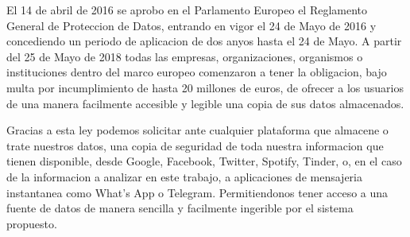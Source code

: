 El 14 de abril de 2016 se aprobo en el Parlamento Europeo el Reglamento General de Proteccion de Datos, entrando en vigor el 24 de Mayo de 2016 y concediendo un periodo de aplicacion de dos anyos hasta el 24 de Mayo. A partir del 25 de Mayo de 2018 todas las empresas, organizaciones, organismos o instituciones dentro del marco europeo comenzaron a tener la obligacion, bajo multa por incumplimiento de hasta 20 millones de euros, de ofrecer a los usuarios de una manera facilmente accesible y legible una copia de sus datos almacenados.

Gracias a esta ley podemos solicitar ante cualquier plataforma que almacene o trate nuestros datos, una copia de seguridad de toda nuestra informacion que tienen disponible, desde Google, Facebook, Twitter, Spotify, Tinder, o, en el caso de la informacion a analizar en este trabajo, a aplicaciones de mensajeria instantanea como What's App o Telegram. Permitiendonos tener acceso a una fuente de datos de manera sencilla y facilmente ingerible por el sistema propuesto.
